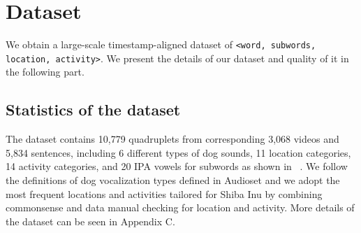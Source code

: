 \section{Dataset}
We obtain a large-scale timestamp-aligned dataset of \texttt{<word, subwords, location, activity>}. We present the details of our dataset and quality of it in the following part. 

\subsection{Statistics of the dataset}
\label{sec:dataset}
The dataset contains 10,779 quadruplets from corresponding 3,068 videos and 5,834 sentences, including 6 different types of dog sounds, 11 location categories, 14 activity categories, and 20 IPA vowels for subwords as shown in ~. We follow the definitions of dog vocalization types defined in Audioset and we adopt the most frequent locations and activities tailored for Shiba Inu by combining commonsense and data manual checking for location and activity. More details of the dataset can be seen in Appendix C. 


